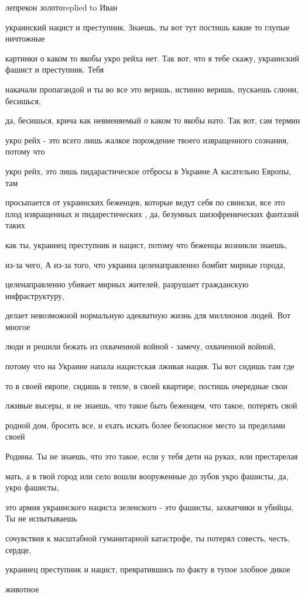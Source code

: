  
 
 
 
 

лепрекон золотоreplied to Иван

украинский нацист и преступник. Знаешь, ты вот тут постишь какие то глупые ничтожные

картинки о каком то якобы укро рейха нет. Так вот, что я тебе скажу, украинский
фашист и преступник. Тебя

накачали пропагандой и ты во все это веришь, истинно веришь, пускаешь слюни,
бесишься,

да, бесишься, крича как невменяемый о каком то якобы нато. Так вот, сам термин

укро рейх - это всего лишь жалкое порождение твоего извращенного сознания,
потому что

 укро рейх, это лишь пидарастическое отбросы в Украине.А касательно Европы, там

просыпается от украинских беженцев, которые ведут себя по свински, все это плод
извращенных и пидарестических , да, безумных шизофренических фантазий таких

как ты, украинец преступник и нацист, потому что беженцы возникли знаешь,

из-за чего, А из-за того, что украина целенаправленно бомбит мирные города,

целенаправленно убивает мирных жителей, разрушает гражданскую инфраструктуру,

делает невозможной нормальную адекватную жизнь для миллионов людей. Вот многое

люди и решили бежать из охваченной войной - замечу, охваченной войной,

потому что на Украине напала нацистская лживая нация. Ты вот сидишь там где

то в своей европе, сидишь в тепле, в своей квартире, постишь очередные свои

лживые высеры, и не знаешь, что такое быть беженцем, что такое, потерять свой

родной дом, бросить все, и ехать искать более безопасное место за пределами своей

Родины. Ты не знаешь, что это такое, если у тебя дети на руках, или престарелая

мать, а в твой город или село вошли вооруженные до зубов укро фашисты, да, укро фашисты,

это армия украинского нациста зеленского - это фашисты, захватчики и убийцы, Ты не испытываешь

сочувствия к масштабной гуманитарной катастрофе, ты потерял совесть, честь, сердце,

украинец преступник и нацист, превратившись по факту в тупое злобное дикое

животное
